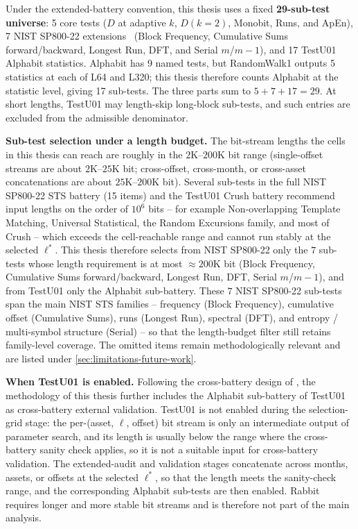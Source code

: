 \documentclass[11pt,titlepage,openany,oneside]{book}  %
\begin{document}
Under the extended-battery convention, this thesis uses a fixed \textbf{29-sub-test universe}: 5 core tests ($D$ at adaptive $k$, $D(k = 2)$, Monobit, Runs, and ApEn), 7 NIST SP800-22 extensions~\citep{bassham2010sp80022} (Block Frequency, Cumulative Sums forward/backward, Longest Run, DFT, and Serial $m$/$m{-}1$), and 17 TestU01 Alphabit statistics. Alphabit has 9 named tests, but RandomWalk1 outputs 5 statistics at each of L64 and L320; this thesis therefore counts Alphabit at the statistic level, giving 17 sub-tests. The three parts sum to $5 + 7 + 17 = 29$. At short lengths, TestU01 may length-skip long-block sub-tests, and such entries are excluded from the admissible denominator.

\textbf{Sub-test selection under a length budget.} The bit-stream lengths the cells in this thesis can reach are roughly in the $2$K--$200$K bit range (single-offset streams are about $2$K--$25$K bit; cross-offset, cross-month, or cross-asset concatenations are about $25$K--$200$K bit). Several sub-tests in the full NIST SP800-22 STS battery (15 items) and the TestU01 Crush battery recommend input lengths on the order of $10^{6}$ bits -- for example Non-overlapping Template Matching, Universal Statistical, the Random Excursions family, and most of Crush -- which exceeds the cell-reachable range and cannot run stably at the selected $\ell^*$. This thesis therefore selects from NIST SP800-22 only the $7$ sub-tests whose length requirement is at most $\approx 200$K bit (Block Frequency, Cumulative Sums forward/backward, Longest Run, DFT, Serial $m$/$m{-}1$), and from TestU01 only the Alphabit sub-battery. These $7$ NIST SP800-22 sub-tests span the main NIST STS families -- frequency (Block Frequency), cumulative offset (Cumulative Sums), runs (Longest Run), spectral (DFT), and entropy / multi-symbol structure (Serial) -- so that the length-budget filter still retains family-level coverage. The omitted items remain methodologically relevant and are listed under \cref{sec:limitations-future-work}.

\textbf{When TestU01 is enabled.} Following the cross-battery design of \citet{onofri2025emergence}, the methodology of this thesis further includes the Alphabit sub-battery of TestU01 as cross-battery external validation. TestU01 is not enabled during the selection-grid stage: the per-(asset, $\ell$, offset) bit stream is only an intermediate output of parameter search, and its length is usually below the range where the cross-battery sanity check applies, so it is not a suitable input for cross-battery validation. The extended-audit and validation stages concatenate across months, assets, or offsets at the selected $\ell^*$, so that the length meets the sanity-check range, and the corresponding Alphabit sub-tests are then enabled. Rabbit requires longer and more stable bit streams and is therefore not part of the main analysis.
\end{document}
